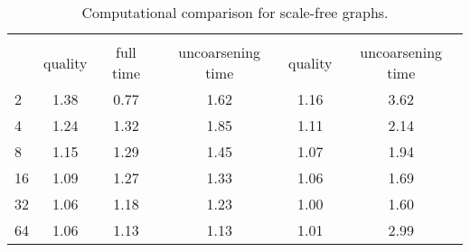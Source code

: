 \documentclass{llncs}
\begin{document}
\begin{table}[htbp]
\begin{center}
\vspace*{-.25cm}
\begin{tabular}{|l|c|c|c|c|c|}
\hline
 &  &  &  &  &  \\ 
  & quality & full time & uncoarsening time & quality & uncoarsening time \\ \hline
2 & 1.38 & 0.77 & 1.62 & 1.16 & 3.62 \\ 
4 & 1.24 & 1.32 & 1.85 & 1.11 & 2.14 \\ 
8 & 1.15 & 1.29 & 1.45 & 1.07 & 1.94 \\ 
16 & 1.09 & 1.27 & 1.33 & 1.06 & 1.69 \\
32 & 1.06 & 1.18 & 1.23 & 1.00 & 1.60 \\
64 & 1.06 &	1.13 &	1.13 &	1.01 &	2.99 \\ \hline

\end{tabular}
\vspace*{.25cm}
\caption{Computational comparison for scale-free graphs.}\label{tab:social}
\vspace*{-1.5cm}
\end{center}
\end{table}
\end{document}
